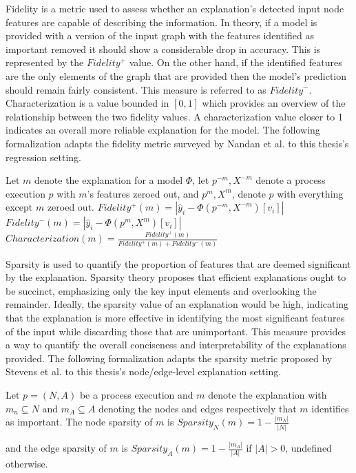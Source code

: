             Fidelity is a metric used to assess whether an explanation's detected input node features are capable of describing the information. In theory, if a model is provided with a version of the input graph with the features identified as important removed it should show a considerable drop in accuracy. This is represented by the $Fidelity^+$ value. On the other hand, if the identified features are the only elements of the graph that are provided then the model's prediction should remain fairly consistent. This measure is referred to as $Fidelity^-$. Characterization is a value bounded in $[0,1]$ which provides an overview of the relationship between the two fidelity values. A characterization value closer to 1 indicates an overall more reliable explanation for the model. The following formalization adapts the fidelity metric surveyed by Nandan et al. \cite{nandan2025} to this thesis's regression setting.

            \begin{definition}
            \label{def:fidelity}
            Let $m$ denote the explanation for a model $\Phi$, let $p^{-m},X^{-m}$ denote a process execution $p$ with $m$'s features zeroed out, and $p^m,X^m$, denote $p$ with everything except $m$ zeroed out.
            $Fidelity^+(m) = |\hat{y}_i-\Phi(p^{-m},X^{-m})[v_i]|$
            $Fidelity^-(m) = |\hat{y}_i-\Phi(p^{m},X^{m})[v_i]|$
            $Characterization(m)=\frac{Fidelity^+(m)}{Fidelity^+(m)+Fidelity^-(m)}$
            \end{definition}

            Sparsity is used to quantify the proportion of features that are deemed significant by the explanation. Sparsity theory proposes that efficient explanations ought to be succinct, emphasizing only the key input elements and overlooking the remainder. Ideally, the sparsity value of an explanation would be high, indicating that the explanation is more effective in identifying the most significant features of the input while discarding those that are unimportant. This measure provides a way to quantify the overall conciseness and interpretability of the explanations provided. The following formalization adapts the sparsity metric proposed by Stevens et al. \cite{stevens2022} to this thesis's node/edge-level explanation setting.

            \begin{definition}
            \label{def:sparsity}
            Let $p=(N,A)$ be a process execution and $m$ denote the explanation with $m_n\subseteq N$ and $m_A \subseteq A$ denoting the nodes and edges respectively that $m$ identifies as important. The node sparsity of $m$ is
            $Sparsity_N(m)=1-\frac{|m_N|}{|N|}$

            and the edge sparsity of $m$ is
            $Sparsity_A(m)= 1 - \frac{|m_A|}{|A|}$ if $|A|>0$, undefined otherwise.
            \end{definition}